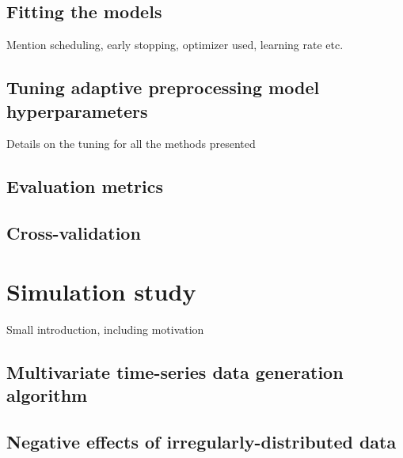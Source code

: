 \documentclass{statsmsc}
\begin{document}

\subsection{Fitting the models}%
\label{sub:Fitting the models}

Mention scheduling, early stopping, optimizer used, learning rate etc.

\subsection{Tuning adaptive preprocessing model hyperparameters}%
\label{sub:Tuning adaptive preprocessing model hyperparameters}

Details on the tuning for all the methods presented

\subsection{Evaluation metrics}%
\label{sub:Evaluation metrics}


\subsection{Cross-validation}%
\label{sub:Cross-validation}



\section{Simulation study}%
\label{sec:Simulation study}%

Small introduction, including motivation

\subsection{Multivariate time-series data generation algorithm}%
\label{sub:Multivariate time-series data generation algorithm}




\subsection{Negative effects of irregularly-distributed data}%
\label{sub:Negative effects of irregularly-distributed data}
\end{document}
